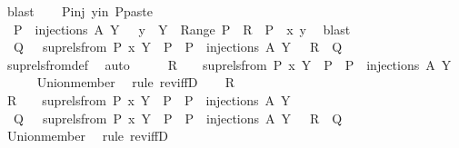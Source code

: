 \begin{isabellebody}
\ blast\isanewline
\isanewline
\ \ \isamarkupfalse%
\ P{\isacharunderscore}inj\ y{\isacharunderscore}in\ P{\isacharunderscore}paste\ \isamarkupfalse%
\ {\isachardoublequoteopen}{\isasymexists}\ P\ {\isasymin}\ injections\ A\ Y\ {\isachardot}\ {\isasymexists}\ y\ {\isasymin}\ Y\ {\isacharminus}\ Range\ P\ {\isachardot}\ R\ {\isacharequal}\ P\ {\isacharplus}{\isacharasterisk}\ {\isacharbraceleft}{\isacharparenleft}x{\isacharcomma}\ y{\isacharparenright}{\isacharbraceright}{\isachardoublequoteclose}\ \isamarkupfalse%
\ blast\isanewline
\ \ \isanewline
\ \ \isamarkupfalse%
\ \isamarkupfalse%
\ {\isachardoublequoteopen}{\isasymexists}\ Q\ {\isasymin}\ {\isacharbraceleft}\ sup{\isacharunderscore}rels{\isacharunderscore}from\ P\ x\ Y\ {\isacharbar}\ P\ {\isachardot}\ P\ {\isasymin}\ injections\ A\ Y\ {\isacharbraceright}\ {\isachardot}\ R\ {\isasymin}\ Q{\isachardoublequoteclose}\isanewline
\ \ \ \ \isamarkupfalse%
\ sup{\isacharunderscore}rels{\isacharunderscore}from{\isacharunderscore}def\ \isamarkupfalse%
\ auto\isanewline
\ \ \isamarkupfalse%
\ \isamarkupfalse%
\ {\isachardoublequoteopen}R\ {\isasymin}\ {\isasymUnion}\ {\isacharbraceleft}\ sup{\isacharunderscore}rels{\isacharunderscore}from\ P\ x\ Y\ {\isacharbar}\ P\ {\isachardot}\ P\ {\isasymin}\ injections\ A\ Y\ {\isacharbraceright}{\isachardoublequoteclose}\isanewline
\ \ \ \ \isamarkupfalse%
\ Union{\isacharunderscore}member\ \isamarkupfalse%
\ {\isacharparenleft}rule\ rev{\isacharunderscore}iffD{}{\isacharparenright}\isanewline
{}\isamarkupfalse%
\isanewline
\ \ \isamarkupfalse%
\ R\isanewline
\ \ \isamarkupfalse%
\ {\isachardoublequoteopen}R\ {\isasymin}\ {\isasymUnion}\ {\isacharbraceleft}\ sup{\isacharunderscore}rels{\isacharunderscore}from\ P\ x\ Y\ {\isacharbar}\ P\ {\isachardot}\ P\ {\isasymin}\ injections\ A\ Y\ {\isacharbraceright}{\isachardoublequoteclose}\isanewline
\ \ \isamarkupfalse%
\ \isamarkupfalse%
\ {\isachardoublequoteopen}{\isasymexists}\ Q\ {\isasymin}\ {\isacharbraceleft}\ sup{\isacharunderscore}rels{\isacharunderscore}from\ P\ x\ Y\ {\isacharbar}\ P\ {\isachardot}\ P\ {\isasymin}\ injections\ A\ Y\ {\isacharbraceright}\ {\isachardot}\ R\ {\isasymin}\ Q{\isachardoublequoteclose}\isanewline
\ \ \ \ \isamarkupfalse%
\ Union{\isacharunderscore}member\ \isamarkupfalse%
\ {\isacharparenleft}rule\ rev{\isacharunderscore}iffD{}{\isacharparenright}\isanewline

\end{isabellebody}

